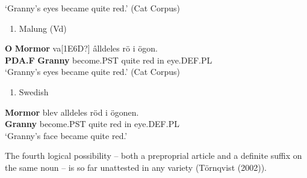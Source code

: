 ‘Granny’s eyes became quite red.’ (Cat Corpus)
\z


\begin{enumerate} %
\item 
Malung (Vd)

\end{enumerate} %
\ea\label{}
\gll \textbf{O} \textbf{Mormor} va[1E6D?]  âlldeles  rö  i  ögon.\\


\textbf{PDA.F} \textbf{Granny} become.PST  quite  red  in  eye.DEF.PL\\ %


‘Granny’s eyes became quite red.’ (Cat Corpus)
\z


\begin{enumerate} %
\item 
Swedish

\end{enumerate} %
\ea\label{}
\gll \textbf{Mormor} blev  alldeles  röd  i  ögonen.\\


\textbf{Granny} become.PST  quite  red  in  eye.DEF.PL\\ %


‘Granny’s face became quite red.’ 
\z


The fourth logical possibility – both a preproprial article and a definite suffix on the same noun – is so far unattested in any variety (Törnqvist (2002)). 

